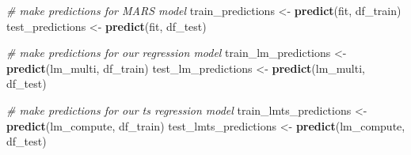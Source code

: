 \documentclass[
]{article}
\newenvironment{Shaded}{\begin{snugshade}}{\end{snugshade}}
\newcommand{\CommentTok}[1]{\textcolor[rgb]{0.56,0.35,0.01}{\textit{#1}}}
\newcommand{\KeywordTok}[1]{\textcolor[rgb]{0.13,0.29,0.53}{\textbf{#1}}}
\newcommand{\NormalTok}[1]{#1}
\newcommand{\StringTok}[1]{\textcolor[rgb]{0.31,0.60,0.02}{#1}}
\begin{document}
\begin{Shaded}
\begin{Highlighting}[]
\CommentTok{# make predictions for MARS model}
\NormalTok{train_predictions <-}\StringTok{ }\KeywordTok{predict}\NormalTok{(fit, df_train)}
\NormalTok{test_predictions <-}\StringTok{ }\KeywordTok{predict}\NormalTok{(fit, df_test)}

\CommentTok{# make predictions for our regression model}
\NormalTok{train_lm_predictions <-}\StringTok{ }\KeywordTok{predict}\NormalTok{(lm_multi, df_train)}
\NormalTok{test_lm_predictions <-}\StringTok{ }\KeywordTok{predict}\NormalTok{(lm_multi, df_test)}

\CommentTok{# make predictions for our ts regression model}
\NormalTok{train_lmts_predictions <-}\StringTok{ }\KeywordTok{predict}\NormalTok{(lm_compute, df_train)}
\NormalTok{test_lmts_predictions <-}\StringTok{ }\KeywordTok{predict}\NormalTok{(lm_compute, df_test)}


\end{Highlighting}
\end{Shaded}
\end{document}
